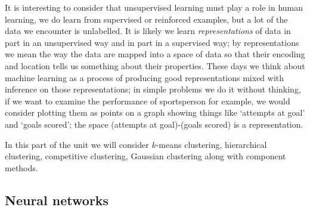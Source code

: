 \documentclass[12pt]{article}
\begin{document}
It is interesting to consider that unsupervised learning must play a
role in human learning, we do learn from supervised or reinforced
examples, but a lot of the data we encounter is unlabelled. It is
likely we learn \textsl{representations} of data in part in an
unsupervised way and in part in a supervised way; by representations
we mean the way the data are mapped into a space of data so that their
encoding and location tells us something about their properties. These
days we think about machine learning as a process of producing good
representations mixed with inference on those representations; in
simple problems we do it without thinking, if we want to examine the
performance of sportsperson for example, we would consider plotting
them as points on a graph showing things like `attempts at goal' and
`goals scored'; the space (attempts at goal)-(goals scored) is a
representation.

In this part of the unit we will consider $k$-means clustering,
hierarchical clustering, competitive clustering, Gaussian clustering
along with component methods.

\subsection{Neural networks}
\end{document}
